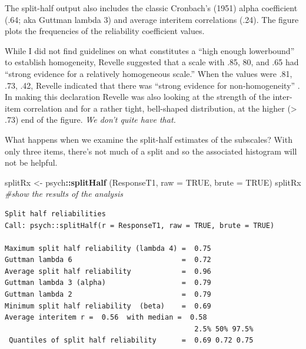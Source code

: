 \documentclass[
  english,
]{book}
\newenvironment{Shaded}{\begin{snugshade}}{\end{snugshade}}
\newcommand{\CommentTok}[1]{\textcolor[rgb]{0.56,0.35,0.01}{\textit{#1}}}
\newcommand{\DataTypeTok}[1]{\textcolor[rgb]{0.13,0.29,0.53}{#1}}
\newcommand{\DecValTok}[1]{\textcolor[rgb]{0.00,0.00,0.81}{#1}}
\newcommand{\KeywordTok}[1]{\textcolor[rgb]{0.13,0.29,0.53}{\textbf{#1}}}
\newcommand{\NormalTok}[1]{#1}
\newcommand{\OperatorTok}[1]{\textcolor[rgb]{0.81,0.36,0.00}{\textbf{#1}}}
\newcommand{\OtherTok}[1]{\textcolor[rgb]{0.56,0.35,0.01}{#1}}
\newcommand{\StringTok}[1]{\textcolor[rgb]{0.31,0.60,0.02}{#1}}
\begin{document}
The split-half output also includes the classic Cronbach's (1951) alpha coefficient (.64; aka Guttman lambda 3) and average interitem correlations (.24). The figure plots the frequencies of the reliability coefficient values.

While I did not find guidelines on what constitutes a ``high enough lowerbound'' to establish homogeneity, Revelle suggested that a scale with .85, 80, and .65 had ``strong evidence for a relatively homogeneous scale.'' When the values were .81, .73, .42, Revelle indicated that there was ``strong evidence for non-homogeneity'' \citep[p.~11]{revelle_reliability_2019}. In making this declaration Revelle was also looking at the strength of the inter-item correlation and for a rather tight, bell-shaped distribution, at the higher (\textgreater{} .73) end of the figure. \emph{We don't quite have that.}

What happens when we examine the split-half estimates of the subscales? With only three items, there's not much of a split and so the associated histogram will not be helpful.

\begin{Shaded}
\begin{Highlighting}[]
\NormalTok{splitRx <-}\StringTok{ }\NormalTok{psych}\OperatorTok{::}\KeywordTok{splitHalf}\NormalTok{ (ResponseT1, }\DataTypeTok{raw =} \OtherTok{TRUE}\NormalTok{, }\DataTypeTok{brute =} \OtherTok{TRUE}\NormalTok{)}
\NormalTok{splitRx }\CommentTok{#show the results of the analysis}
\end{Highlighting}
\end{Shaded}

\begin{verbatim}
Split half reliabilities  
Call: psych::splitHalf(r = ResponseT1, raw = TRUE, brute = TRUE)

Maximum split half reliability (lambda 4) =  0.75
Guttman lambda 6                          =  0.72
Average split half reliability            =  0.96
Guttman lambda 3 (alpha)                  =  0.79
Guttman lambda 2                          =  0.79
Minimum split half reliability  (beta)    =  0.69
Average interitem r =  0.56  with median =  0.58
                                             2.5% 50% 97.5%
 Quantiles of split half reliability      =  0.69 0.72 0.75
\end{verbatim}

\begin{Shaded}
\end{Shaded}
\end{document}
